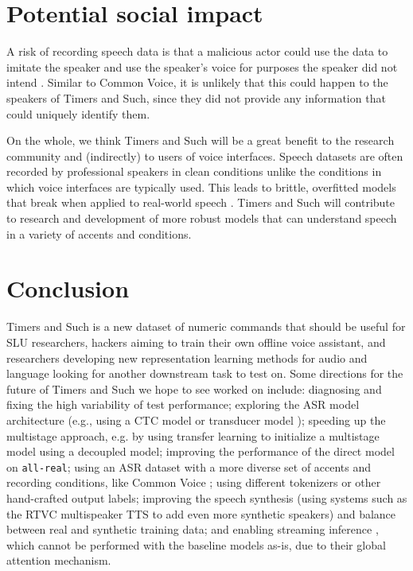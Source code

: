 \documentclass{article}
\begin{document}
\section{Potential social impact}\label{social-impact}
A risk of recording speech data is that a malicious actor could use the data to imitate the speaker and use the speaker's voice for purposes the speaker did not intend \cite{ovadya2019reducing}. Similar to Common Voice, it is unlikely that this could happen to the speakers of Timers and Such, since they did not provide any information that could uniquely identify them. 

On the whole, we think Timers and Such will be a great benefit to the research community and (indirectly) to users of voice interfaces. Speech datasets are often recorded by professional speakers in clean conditions unlike the conditions in which voice interfaces are typically used. This leads to brittle, overfitted models that break when applied to real-world speech \cite{likhomanenko2020rethinking}. Timers and Such will contribute to research and development of more robust models that can understand speech in a variety of accents and conditions.


\section{Conclusion}

Timers and Such is a new dataset of numeric commands that should be useful for SLU researchers, hackers aiming to train their own offline voice assistant, and researchers developing new representation learning methods for audio and language \cite{tamkin2020viewmaker, chung2020semi, pascual2019learning, baevski2020wav2vec} looking for another downstream task to test on. Some directions for the future of Timers and Such we hope to see worked on include: diagnosing and fixing the high variability of test performance; exploring the ASR model architecture (e.g., using a CTC model or transducer model \cite{graves2012sequence}); speeding up the multistage approach, e.g. by using transfer learning to initialize a multistage model using a decoupled model;  improving the performance of the direct model on \texttt{all-real}; using an ASR dataset with a more diverse set of accents and recording conditions, like Common Voice \cite{ardila2019common}; using different tokenizers or other hand-crafted output labels; improving the speech synthesis (using systems such as the RTVC multispeaker TTS  \cite{jia2018transfer, jemine2019master} to add even more synthetic speakers) and balance between real and synthetic training data; and enabling streaming inference \cite{mhiri2020low, potdar2021streaming}, which cannot be performed with the baseline models as-is, due to their global attention mechanism.
\end{document}
